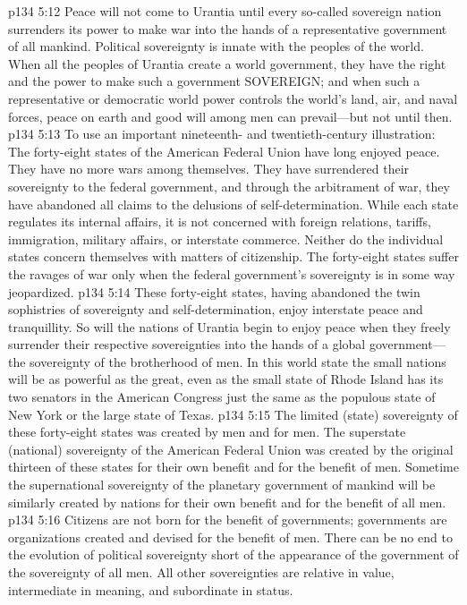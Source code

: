 \pc \vs p134 5:12 Peace will not come to Urantia until every so\hyp{}called sovereign nation surrenders its power to make war into the hands of a representative government of all mankind. Political sovereignty is innate with the peoples of the world. When all the peoples of Urantia create a world government, they have the right and the power to make such a government SOVEREIGN; and when such a representative or democratic world power controls the world’s land, air, and naval forces, peace on earth and good will among men can prevail---but not until then.
\vs p134 5:13 To use an important nineteenth\hyp{} and twentieth\hyp{}century illustration: The forty\hyp{}eight states of the American Federal Union have long enjoyed peace. They have no more wars among themselves. They have surrendered their sovereignty to the federal government, and through the arbitrament of war, they have abandoned all claims to the delusions of self\hyp{}determination. While each state regulates its internal affairs, it is not concerned with foreign relations, tariffs, immigration, military affairs, or interstate commerce. Neither do the individual states concern themselves with matters of citizenship. The forty\hyp{}eight states suffer the ravages of war only when the federal government’s sovereignty is in some way jeopardized.
\pc \vs p134 5:14 These forty\hyp{}eight states, having abandoned the twin sophistries of sovereignty and self\hyp{}determination, enjoy interstate peace and tranquillity. So will the nations of Urantia begin to enjoy peace when they freely surrender their respective sovereignties into the hands of a global government---the sovereignty of the brotherhood of men. In this world state the small nations will be as powerful as the great, even as the small state of Rhode Island has its two senators in the American Congress just the same as the populous state of New York or the large state of Texas.
\vs p134 5:15 The limited (state) sovereignty of these forty\hyp{}eight states was created by men and for men. The superstate (national) sovereignty of the American Federal Union was created by the original thirteen of these states for their own benefit and for the benefit of men. Sometime the supernational sovereignty of the planetary government of mankind will be similarly created by nations for their own benefit and for the benefit of all men.\plusone
\vs p134 5:16 Citizens are not born for the benefit of governments; governments are organizations created and devised for the benefit of men. There can be no end to the evolution of political sovereignty short of the appearance of the government of the sovereignty of all men. All other sovereignties are relative in value, intermediate in meaning, and subordinate in status.

